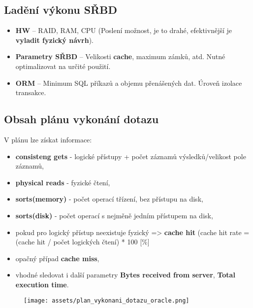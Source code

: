 \subsection{Ladění výkonu SŘBD}
\begin{itemize}
  \item \textbf{HW} -- RAID, RAM, CPU (Poslení možnost, je to drahé, efektivnější je \textbf{vyladit fyzický návrh}).
  \item \textbf{Parametry SŘBD} -- Velikosti \textbf{cache}, maximum zámků, atd. Nutné optimalizovat na určité použití.
  \item \textbf{ORM} -- Minimum SQL příkazů a objemu přenášených dat. Úroveň izolace transakce.
\end{itemize}

\subsection{Obsah plánu vykonání dotazu}
V plánu lze získat informace:
\begin{itemize}
  \item \textbf{consisteng gets}  - logické přístupy + počet záznamů výsledků/velikost pole záznamů,
  \item \textbf{physical reads} - fyzické čtení,
  \item \textbf{sorts(memory)} - počet operací třízení, bez přístupu na disk,
  \item \textbf{sorts(disk)} - počet operací s nejměně jedním přístupem na disk,
  \item pokud pro logický přístup neexistuje fyzický => \textbf{cache hit} (cache hit rate = (cache hit / počet logických čtení) * 100 [\%]
  \item opačný případ \textbf{cache miss},
  \item vhodné sledovat i další parametry \textbf{Bytes received from server}, \textbf{Total execution time}.
\end{itemize}

\begin{figure}[H]
  \texttt{[image: assets/plan\_vykonani\_dotazu\_oracle.png]}
\end{figure}